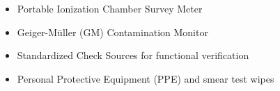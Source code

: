 \begin{itemize}
    \item Portable Ionization Chamber Survey Meter
    \item Geiger-Müller (GM) Contamination Monitor
    \item Standardized Check Sources for functional verification
    \item Personal Protective Equipment (PPE) and smear test wipes
\end{itemize}